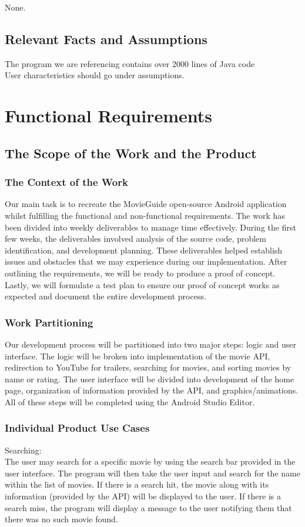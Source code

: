 \documentclass[12pt, titlepage]{article}
\begin{document}
None.

\subsection{Relevant Facts and Assumptions}
The program we are referencing contains over 2000 lines of Java code\\

User characteristics should go under assumptions.

\section{Functional Requirements}

\subsection{The Scope of the Work and the Product}
\subsubsection{The Context of the Work}
Our main task is to recreate the MovieGuide open-source Android application whilst fulfilling the functional and non-functional requirements. The work has been divided into weekly deliverables to manage time effectively. During the first few weeks, the deliverables involved analysis of the source code, problem identification, and development planning. These deliverables helped establish issues and obstacles that we may experience during our implementation. After outlining the requirements, we will be ready to produce a proof of concept. Lastly, we will formulate a test plan to ensure our proof of concept works as expected and document the entire development process. 

\subsubsection{Work Partitioning}
Our development process will be partitioned into two major steps: logic and user interface. The logic will be broken into implementation of the movie API, redirection to YouTube for trailers, searching for movies, and sorting movies by name or rating. The user interface will be divided into development of the home page, organization of information provided by the API, and graphics/animations. All of these steps will be completed using the Android Studio Editor.

\subsubsection{Individual Product Use Cases}
Searching:\\
The user may search for a specific movie by using the search bar provided in the user interface. The program will then take the user input and search for the name within the list of movies. If there is a search hit, the movie along with its information (provided by the API) will be displayed to the user. If there is a search miss, the program will display a message to the user notifying them that there was no such movie found. \\
\end{document}
